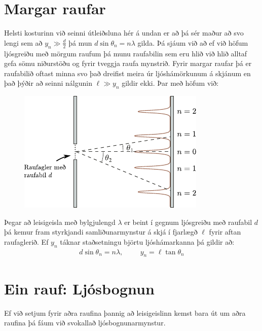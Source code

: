 \section{Margar raufar}

Helsti kosturinn við seinni útleiðsluna hér á undan er að þá sér maður að svo lengi sem að $y_n \gg \frac{d}{2}$ þá mun $d\sin\theta_n = n\lambda$ gilda. Þá sjáum við að ef við höfum ljósgreiðu með mörgum raufum þá munu raufabilin sem eru hlið við hlið alltaf gefa sömu niðurstöðu og fyrir tveggja raufa mynstrið. Fyrir margar raufar þá er raufabilið oftast minna svo það dreifist meira úr ljóshámörkunum á skjánum en það þýðir að seinni nálgunin $\ell \gg y_n$ gildir ekki. Þar með höfum við:
\begin{figure}[H]
    \centering
    \includegraphics{figures/manyslits.pdf}
\end{figure}

\begin{tcolorbox}
\begin{theorem}
Þegar að leisigeisla með bylgjulengd $\lambda$ er beint í gegnum ljósgreiðu með raufabil $d$ þá kemur fram styrkjandi samliðunarmynstur á skjá í fjarlægð $\ell$ fyrir aftan raufaglerið. Ef $y_n$ táknar staðsetningu björtu ljóshámarkanna þá gildir að:
\begin{align*}
    d\sin\theta_n = n\lambda, \hspace{1cm} y_n = \ell \tan\theta_n
\end{align*}
\end{theorem}
\end{tcolorbox}

\section{Ein rauf: Ljósbognun}

Ef við setjum fyrir aðra raufina þannig að leisigeislinn kemst bara út um aðra raufina þá fáum við svokallað ljósbognunarmynstur.

